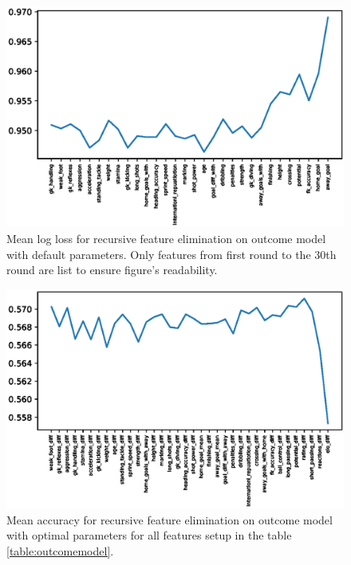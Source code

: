 \begin{figure}[H]
    \centering
    \includegraphics[width=1\textwidth]{img/default_avg_lloss.eps}
    \caption{Mean log loss for recursive feature elimination on outcome model with default parameters. Only features from first round to the 30th round are list to ensure figure's readability.}
    \label{fig:def_avg_loss}
\end{figure}

\begin{figure}[H]
    \centering
    \includegraphics[width=1\textwidth]{img/optimal_avg_accuracy.eps}
    \caption{Mean accuracy for recursive feature elimination on outcome model with optimal parameters for all features setup in the table \ref{table:outcomemodel}.}
    \label{fig:optimal_avg_accu}
\end{figure}


